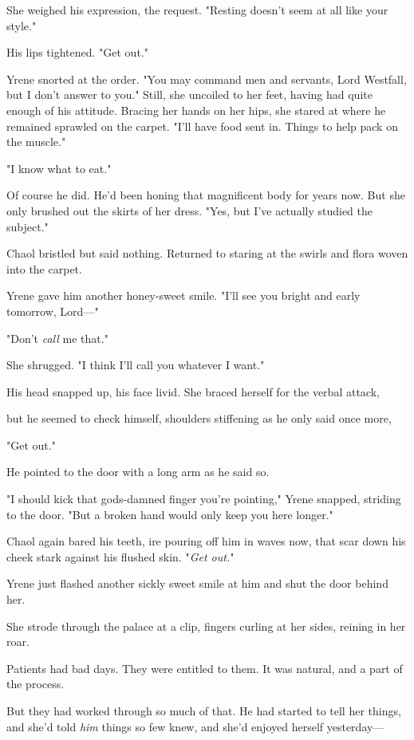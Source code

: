 She weighed his expression, the request. "Resting doesn't seem at all like your style."

His lips tightened. "Get out."

Yrene snorted at the order. "You may command men and servants, Lord Westfall, but I don't answer to you." Still, she uncoiled to her feet, having had quite enough of his attitude. Bracing her hands on her hips, she stared at where he remained sprawled on the carpet. "I'll have food sent in. Things to help pack on the muscle."

"I know what to eat."

Of course he did. He'd been honing that magnificent body for years now. But she only brushed out the skirts of her dress. "Yes, but I've actually studied the subject."

Chaol bristled but said nothing. Returned to staring at the swirls and flora woven into the carpet.

Yrene gave him another honey-sweet smile. "I'll see you bright and early tomorrow, Lord---"

"Don't \emph{call} me that."

She shrugged. "I think I'll call you whatever I want."

His head snapped up, his face livid. She braced herself for the verbal attack,

but he seemed to check himself, shoulders stiffening as he only said once more,

"Get out."

He pointed to the door with a long arm as he said so.

"I should kick that gods-damned finger you're pointing," Yrene snapped, striding to the door. "But a broken hand would only keep you here longer."

Chaol again bared his teeth, ire pouring off him in waves now, that scar down his cheek stark against his flushed skin. "\emph{Get out.}"

Yrene just flashed another sickly sweet smile at him and shut the door behind her.

She strode through the palace at a clip, fingers curling at her sides, reining in her roar.

Patients had bad days. They were entitled to them. It was natural, and a part of the process.

But  they had worked through so much of that. He had started to tell her things, and she'd told \emph{him} things so few knew, and she'd enjoyed herself yesterday---

